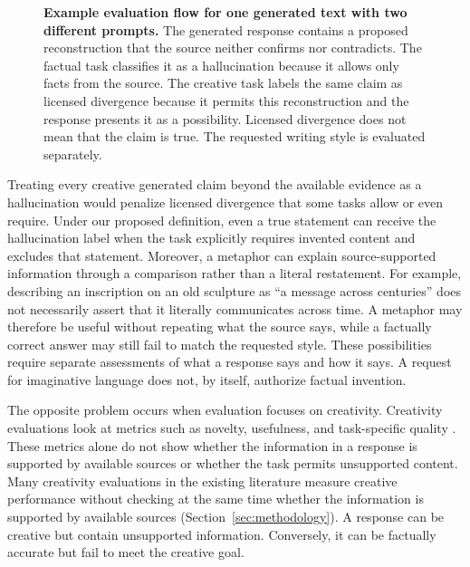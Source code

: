 \documentclass{clv2025}
\begin{document}
\begin{figure}[!t]
{%
}
\endgroup
\caption{\textbf{Example evaluation flow for one generated text with two different prompts. %
}
The generated response contains a proposed reconstruction that the source neither confirms nor contradicts. The factual task
classifies it as a hallucination because it allows only facts from the source.
The creative task labels the same claim as licensed divergence because it permits this reconstruction and the response presents it as a possibility. Licensed divergence does
not mean that the claim is true. The requested writing style is evaluated separately.}
\label{fig:prompt-to-claim}
\end{figure}

Treating every creative generated claim beyond the available evidence as a
hallucination would penalize licensed divergence that some tasks allow or even require.
Under our proposed definition, even a true statement can receive the hallucination label when the task explicitly requires invented content and excludes that statement. %
Moreover, a metaphor can explain source-supported information through a comparison
rather than a literal restatement.
For example, describing an inscription on an old sculpture as ``a message across centuries''
does not necessarily assert that it literally communicates across time.
A metaphor may therefore be useful without repeating what the source says,
while a factually correct answer may still fail to match the requested style.
These possibilities require separate assessments of what a response says
and how it says.
A request for imaginative language does not, by itself, authorize factual invention.

The opposite problem occurs when evaluation focuses on creativity.
Creativity evaluations look at metrics such as novelty, usefulness, and
task-specific quality
\citep{runco_standard_2012,hou_creativityprism_2025,zhao_assessing_2025}.
These metrics alone do not show whether the information in a response is
supported by available sources or whether the task permits unsupported
content.
Many creativity evaluations in the existing literature measure creative
performance without checking at the same time whether the information is
supported by available sources (Section~\ref{sec:methodology}).
A response can be creative but contain unsupported
information. Conversely, it can be factually accurate but fail to meet the creative goal.
\end{document}
